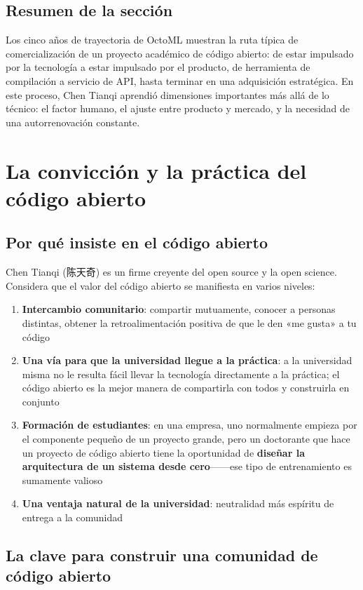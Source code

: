 \documentclass[a4paper]{article}
\begin{document}
\subsection{Resumen de la sección}

Los cinco años de trayectoria de OctoML muestran la ruta típica de comercialización de un proyecto académico de código abierto: de estar impulsado por la tecnología a estar impulsado por el producto, de herramienta de compilación a servicio de API, hasta terminar en una adquisición estratégica. En este proceso, Chen Tianqi aprendió dimensiones importantes más allá de lo técnico: el factor humano, el ajuste entre producto y mercado, y la necesidad de una autorrenovación constante.
\section{La convicción y la práctica del código abierto}

\subsection{Por qué insiste en el código abierto}

Chen Tianqi (陈天奇) es un firme creyente del open source y la open science. Considera que el valor del código abierto se manifiesta en varios niveles:

\begin{enumerate}
    \item \textbf{Intercambio comunitario}: compartir mutuamente, conocer a personas distintas, obtener la retroalimentación positiva de que le den «me gusta» a tu código
    \item \textbf{Una vía para que la universidad llegue a la práctica}: a la universidad misma no le resulta fácil llevar la tecnología directamente a la práctica; el código abierto es la mejor manera de compartirla con todos y construirla en conjunto
    \item \textbf{Formación de estudiantes}: en una empresa, uno normalmente empieza por el componente pequeño de un proyecto grande, pero un doctorante que hace un proyecto de código abierto tiene la oportunidad de \textbf{diseñar la arquitectura de un sistema desde cero}------ese tipo de entrenamiento es sumamente valioso
    \item \textbf{Una ventaja natural de la universidad}: neutralidad más espíritu de entrega a la comunidad
\end{enumerate}

\subsection{La clave para construir una comunidad de código abierto}
\end{document}
